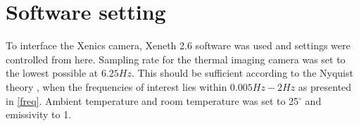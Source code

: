 \section{Software setting}

To interface the Xenics camera, Xeneth 2.6 software was used and settings were controlled from here.   
Sampling rate for the thermal imaging camera was set to the lowest possible at $6.25 Hz$. This should be sufficient according to the Nyquist theory \cite{weik2001}, when the frequencies of interest lies within $0.005 Hz-2 Hz$ as presented in \cref{freq}. Ambient temperature and room temperature was set to 25$^{\circ}$ and emissivity to 1.



